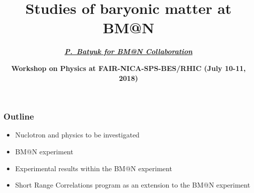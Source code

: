\documentclass[dvipsnames] {beamer}
\title[\bf 7th International Conference on New Frontiers in Physics (ICNFP2018) ]{\textbf{\large {Studies of baryonic matter at BM@N}}}
\author[\bf P.~Batyuk]{\textit{\textbf{{\footnotesize \underline{P.~Batyuk for BM@N Collaboration}}}}}
\institute{\bf Dubna, Joint Institute for Nuclear Research}
\date{{\textbf{Workshop on Physics at FAIR-NICA-SPS-BES/RHIC (July 10-11, 2018)}}}
\begin{document}
\maketitle

\begin{frame}
  \bf
  \frametitle{\bf \centering Outline}
  \begin{itemize}
  \item Nuclotron and physics to be investigated
  \item BM@N experiment
  \item Experimental results within the BM@N experiment
  \item Short Range Correlations program as an extension to the BM@N experiment
  \end{itemize}
\end{frame}
\end{document}
